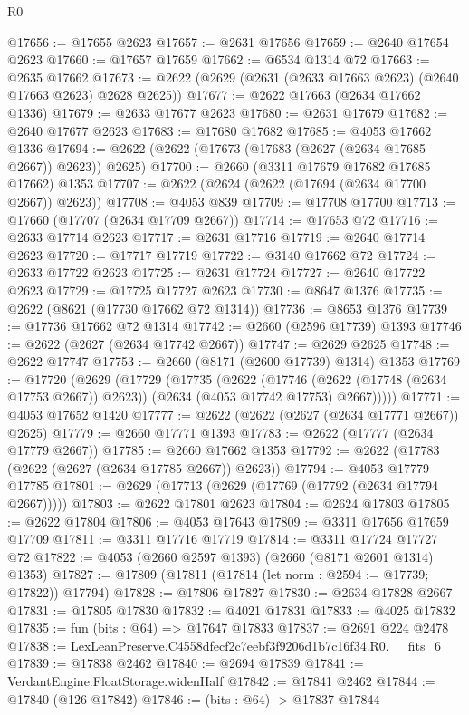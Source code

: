 \begin{lexlean}{R0}
\begin{coremodule}
@17656 := @17655 @2623
@17657 := @2631 @17656
@17659 := @2640 @17654 @2623
@17660 := @17657 @17659
@17662 := @6534 @1314 @72
@17663 := @2635 @17662
@17673 := @2622 (@2629 (@2631 (@2633 @17663 @2623) (@2640 @17663 @2623) @2628 @2625))
@17677 := @2622 @17663 (@2634 @17662 @1336)
@17679 := @2633 @17677 @2623
@17680 := @2631 @17679
@17682 := @2640 @17677 @2623
@17683 := @17680 @17682
@17685 := @4053 @17662 @1336
@17694 := @2622 (@2622 (@17673 (@17683 (@2627 (@2634 @17685 @2667)) @2623)) @2625)
@17700 := @2660 (@3311 @17679 @17682 @17685 @17662) @1353
@17707 := @2622 (@2624 (@2622 (@17694 (@2634 @17700 @2667)) @2623))
@17708 := @4053 @839
@17709 := @17708 @17700
@17713 := @17660 (@17707 (@2634 @17709 @2667))
@17714 := @17653 @72
@17716 := @2633 @17714 @2623
@17717 := @2631 @17716
@17719 := @2640 @17714 @2623
@17720 := @17717 @17719
@17722 := @3140 @17662 @72
@17724 := @2633 @17722 @2623
@17725 := @2631 @17724
@17727 := @2640 @17722 @2623
@17729 := @17725 @17727 @2623
@17730 := @8647 @1376
@17735 := @2622 (@8621 (@17730 @17662 @72 @1314))
@17736 := @8653 @1376
@17739 := @17736 @17662 @72 @1314
@17742 := @2660 (@2596 @17739) @1393
@17746 := @2622 (@2627 (@2634 @17742 @2667))
@17747 := @2629 @2625
@17748 := @2622 @17747
@17753 := @2660 (@8171 (@2600 @17739) @1314) @1353
@17769 := @17720
    (@2629
      (@17729
        (@17735
          (@2622
            (@17746 (@2622 (@17748 (@2634 @17753 @2667)) @2623))
            (@2634 (@4053 @17742 @17753) @2667)))))
@17771 := @4053 @17652 @1420
@17777 := @2622 (@2622 (@2627 (@2634 @17771 @2667)) @2625)
@17779 := @2660 @17771 @1393
@17783 := @2622 (@17777 (@2634 @17779 @2667))
@17785 := @2660 @17662 @1353
@17792 := @2622 (@17783 (@2622 (@2627 (@2634 @17785 @2667)) @2623))
@17794 := @4053 @17779 @17785
@17801 := @2629 (@17713 (@2629 (@17769 (@17792 (@2634 @17794 @2667)))))
@17803 := @2622 @17801 @2623
@17804 := @2624 @17803
@17805 := @2622 @17804
@17806 := @4053 @17643
@17809 := @3311 @17656 @17659 @17709
@17811 := @3311 @17716 @17719
@17814 := @3311 @17724 @17727 @72
@17822 := @4053 (@2660 @2597 @1393) (@2660 (@8171 @2601 @1314) @1353)
@17827 := @17809 (@17811 (@17814 (let norm : @2594 := @17739; @17822)) @17794)
@17828 := @17806 @17827
@17830 := @2634 @17828 @2667
@17831 := @17805 @17830
@17832 := @4021 @17831
@17833 := @4025 @17832
@17835 := fun (bits : @64) => @17647 @17833
@17837 := @2691 @224 @2478
@17838 := LexLeanPreserve.C4558dfecf2c7eebf3f9206d1b7c16f34.R0.__fits_6
@17839 := @17838 @2462
@17840 := @2694 @17839
@17841 := VerdantEngine.FloatStorage.widenHalf
@17842 := @17841 @2462
@17844 := @17840 (@126 @17842)
@17846 := (bits : @64) -> @17837 @17844

\end{coremodule}
\end{lexlean}
